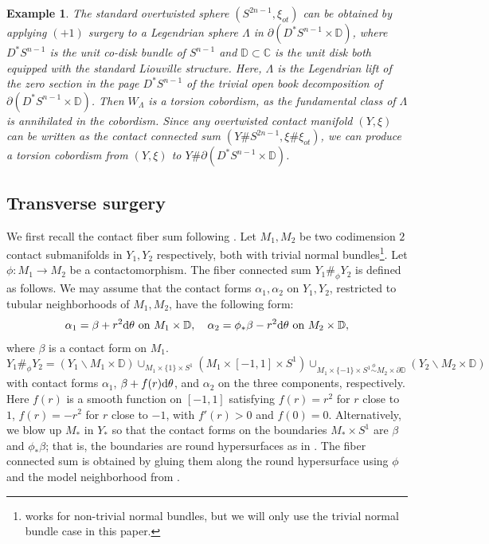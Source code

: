 \documentclass[11pt]{amsart}
\numberwithin{equation}{section}
\newtheorem{example}[theorem]{\textbf{Example}}
\def\C{{\mathbb C}}
\def\D{{\mathbb D}}
\def\rd{{\rm d}}
\begin{document}
\begin{example}\label{ex:ot}
The standard overtwisted sphere $(S^{2n-1},\xi_{ot})$ can be obtained by applying $(+1)$ surgery to a Legendrian sphere $\Lambda$ in $\partial(D^*{S^{n-1}}\times \D)$, where $D^*S^{n-1}$ is the unit co-disk bundle of $S^{n-1}$ and $\D\subset \C$ is the unit disk both equipped with the standard Liouville structure. Here, $\Lambda$ is the Legendrian lift of the zero section in the page $D^*S^{n-1}$ of the trivial open book decomposition of $\partial(D^*{S^{n-1}}\times \D)$. Then $W_{\Lambda}$ is a torsion cobordism, as the fundamental class of $\Lambda$ is annihilated in the cobordism. Since any overtwisted contact manifold $(Y,\xi)$ can be written as the contact connected sum $(Y\# S^{2n-1},\xi\# \xi_{ot})$, we can produce a torsion cobordism from $(Y,\xi)$ to $Y\#\partial(D^*S^{n-1}\times \D)$.
\end{example}

\subsection{Transverse surgery}
We first recall the contact fiber sum following \cite[Theorem 7.4.3]{Geiges}. Let $M_1,M_2$ be two codimension $2$ contact submanifolds in $Y_1, Y_2$ respectively, both with trivial normal bundles\footnote{\cite[Theorem 7.4.3]{Geiges} works for non-trivial normal bundles, but we will only use the trivial normal bundle case in this paper.}. Let $\phi:M_1\to M_2$ be a contactomorphism. The fiber connected sum $Y_1\#_{\phi}Y_2$ is defined as follows. We may assume that the contact forms $\alpha_1,\alpha_2$ on $Y_1,Y_2$, restricted to tubular neighborhoods of $M_1,M_2$, have the following form:
$$\alpha_1=\beta+r^2\rd\theta \text{ on } M_1\times \D, \quad \alpha_2=\phi_*\beta-r^2\rd\theta \text{ on } M_2\times \D,$$
where $\beta$ is a contact form on $M_1$. 
$$Y_1\#_{\phi}Y_2=(Y_1\backslash M_1\times \D)\cup_{M_1\times \{1\}\times S^1} (M_1\times [-1,1]\times S^1) \cup_{M_1\times \{-1\}\times S^1\stackrel{\phi}{\sim} M_2\times \partial \D} (Y_2\backslash M_2\times \D)$$
with contact forms $\alpha_1$, $\beta+f(r)\rd\theta$, and $\alpha_2$ on the three components, respectively. Here $f(r)$ is a smooth function on $[-1,1]$ satisfying $f(r)=r^2$ for $r$ close to $1$, $f(r)=-r^2$ for $r$ close to $-1$, with $f'(r)>0$ and $f(0)=0$. Alternatively, we blow up $M_*$ in $Y_*$ so that the contact forms on the boundaries $M_*\times S^1$ are $\beta$ and $\phi_*\beta$; that is, the boundaries are round hypersurfaces as in \cite[\S 4.1]{MNW}. The fiber connected sum is obtained by gluing them along the round hypersurface using $\phi$ and the model neighborhood from \cite[Lemma 4.1]{MNW}.
\end{document}
